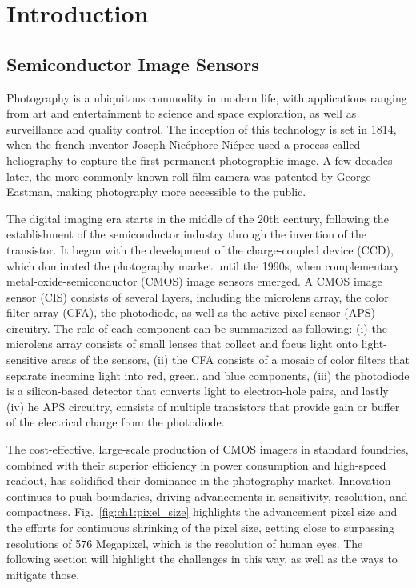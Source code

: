 \chapter{Introduction}\label{ch:introduction}

\section{Semiconductor Image Sensors}

Photography is a ubiquitous commodity in modern life, with applications ranging from art and entertainment to science and space exploration, as well as surveillance and quality control. The inception of this technology is set in 1814, when the french inventor Joseph Nicéphore Niépce used a process called heliography to capture the first permanent photographic image. A few decades later, the more commonly known roll-film camera was patented by George Eastman, making photography more accessible to the public.

The digital imaging era starts in the middle of the 20th century, following the establishment of the semiconductor industry through the invention of the transistor. It began with the development of the charge-coupled device (CCD), which dominated the photography market until the 1990s, when complementary metal-oxide-semiconductor (CMOS) image sensors emerged. A CMOS image sensor (CIS) consists of several layers, including the microlens array, the color filter array (CFA), the photodiode, as well as the active pixel sensor (APS) circuitry. The role of each component can be summarized as following: (i) the microlens array consists of small lenses that collect and focus light onto light-sensitive areas of the sensors, (ii) the CFA consists of a mosaic of color filters that separate incoming light into red, green, and blue components, (iii) the photodiode is a silicon-based detector that converts light to electron-hole pairs, and lastly (iv) he APS circuitry, consists of multiple transistors that provide gain or buffer of the electrical charge from the photodiode.


The cost-effective, large-scale production of CMOS imagers in standard foundries, combined with their superior efficiency in power consumption and high-speed readout, has solidified their dominance in the photography market. Innovation continues to push boundaries, driving advancements in sensitivity, resolution, and compactness. Fig.~\ref{fig:ch1:pixel_size} highlights the advancement pixel size and the efforts for continuous shrinking of the pixel size, getting close to surpassing resolutions of 576 Megapixel, which is the resolution of human eyes. The following section will highlight the challenges in this way, as well as the ways to mitigate those. 


